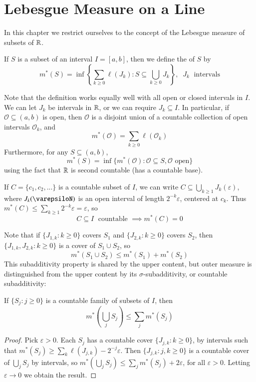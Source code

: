 \chapter{Lebesgue Measure on a Line}


In this chapter we restrict ourselves to the concept of the Lebesgue measure of subsets of $\mathbb R$.

\begin{defn}
    If $S$ is a subset of an interval $I = [a,b]$, then we define the  of $S$ by $$m^*(S) = \inf\left\{\sum_{k\geq 0}\ell(J_k):S\subseteq \bigcup_{k\geq 0}J_k\right\},\;\;J_k\;\text{ intervals}$$
\end{defn}
Note that the definition works equally well with all open or closed intervals in $I$. We can let $J_k$ be intervals in $\mathbb R$, or we can require $J_k \subseteq I$. In particular, if $\mathcal{O} \subseteq (a,b)$ is open, then $\mathcal{O}$ is a disjoint union of a countable collection of open intervals $\mathcal{O}_k$, and $$m^*(\mathcal{O}) = \sum_{k\geq 0}\ell(\mathcal{O}_k)$$
Furthermore, for any $S \subseteq (a,b)$, $$m^*(S) = \inf\{m^*(\mathcal{O}):\mathcal{O}\subseteq S,\mathcal{O}\text{ open}\}$$
using the fact that $\mathbb R$ is second countable (has a countable base).

If $C = \{c_1,c_2,...\}$ is a countable subset of $I$, we can write $C \subseteq \bigcup_{k\geq 1}J_k(\varepsilon)$, where $J_k(\varepsiloN)$ is an open interval of length $2^{-k}\varepsilon$, centered at $c_k$. Thus $m^*(C) \leq \sum_{k\geq 1}2^{-k}\varepsilon = \varepsilon$, so $$C \subseteq I\;\text{ countable }\implies m^*(C) = 0$$

Note that if $\{J_{1,k}:k\geq 0\}$ covers $S_1$ and $\{J_{2,k}:k\geq 0\}$ covers $S_2$, then $\{J_{1,k},J_{2,k}:k\geq 0\}$ is a cover of $S_1\cup S_2$, so $$m^*(S_1\cup S_2) \leq m^*(S_1) + m^*(S_2)$$
This subadditivity property is shared by the upper content, but outer measure is distinguished from the upper content by its $\sigma$-subadditivity, or countable subadditivity:

\begin{prop}
    If $\{S_j:j\geq 0\}$ is a countable family of subsets of $I$, then $$m^*\left(\bigcup_jS_j\right) \leq \sum_jm^*(S_j)$$
\end{prop}
\begin{proof}
    Pick $\varepsilon > 0$. Each $S_j$ has a countable cover $\{J_{j,k}:k\geq 0\}$, by intervals such that $m^*(S_j) \geq \sum_k\ell(J_{j,k}) -2^{-j}\varepsilon$. Then $\{J_{j,k}:j,k\geq 0\}$ is a countable cover of $\bigcup_jS_j$ by intervals, so $m^*\left(\bigcup_jS_j\right) \leq \sum_jm^*(S_j) + 2\varepsilon$, for all $\varepsilon > 0$. Letting $\varepsilon\rightarrow 0$ we obtain the result.
\end{proof}

